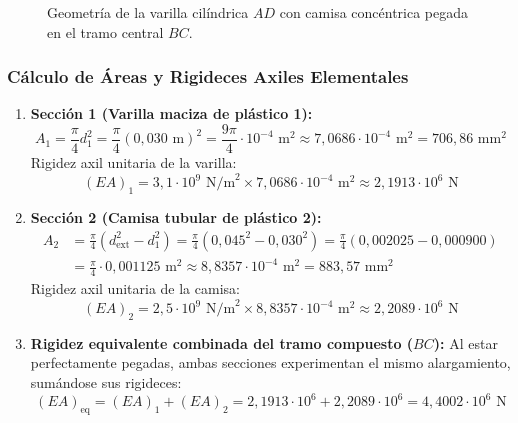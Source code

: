 \begin{figure}[H]
    \caption{Geometría de la varilla cilíndrica $AD$ con camisa concéntrica pegada en el tramo central $BC$.}
    \label{fig:varilla_camisa_geometria}
\end{figure}

\subsubsection{Cálculo de Áreas y Rigideces Axiles Elementales}

\begin{enumerate}
    \item \textbf{Sección 1 (Varilla maciza de plástico 1):}
    \begin{equation}
        A_1 = \frac{\pi}{4} d_1^2 = \frac{\pi}{4} (0{,}030\text{ m})^2 = \frac{9\pi}{4} \cdot 10^{-4}\text{ m}^2 \approx 7{,}0686 \cdot 10^{-4}\text{ m}^2 = 706{,}86\text{ mm}^2
    \end{equation}
    Rigidez axil unitaria de la varilla:
    \begin{equation}
        (E A)_1 = 3{,}1 \cdot 10^9\text{ N/m}^2 \times 7{,}0686 \cdot 10^{-4}\text{ m}^2 \approx 2{,}1913 \cdot 10^6\text{ N}
    \end{equation}

    \item \textbf{Sección 2 (Camisa tubular de plástico 2):}
    \begin{align}
        A_2 &= \frac{\pi}{4} \left(d_{\text{ext}}^2 - d_1^2\right) = \frac{\pi}{4} \left(0{,}045^2 - 0{,}030^2\right) = \frac{\pi}{4} (0{,}002025 - 0{,}000900) \nonumber \\
        &= \frac{\pi}{4} \cdot 0{,}001125\text{ m}^2 \approx 8{,}8357 \cdot 10^{-4}\text{ m}^2 = 883{,}57\text{ mm}^2
    \end{align}
    Rigidez axil unitaria de la camisa:
    \begin{equation}
        (E A)_2 = 2{,}5 \cdot 10^9\text{ N/m}^2 \times 8{,}8357 \cdot 10^{-4}\text{ m}^2 \approx 2{,}2089 \cdot 10^6\text{ N}
    \end{equation}

    \item \textbf{Rigidez equivalente combinada del tramo compuesto ($BC$):}
    Al estar perfectamente pegadas, ambas secciones experimentan el mismo alargamiento, sumándose sus rigideces:
    \begin{equation}
        (EA)_{\text{eq}} = (EA)_1 + (EA)_2 = 2{,}1913 \cdot 10^6 + 2{,}2089 \cdot 10^6 = 4{,}4002 \cdot 10^6\text{ N}
    \end{equation}
\end{enumerate}


